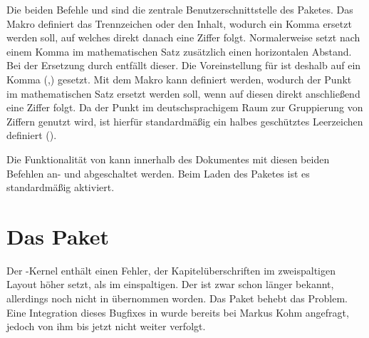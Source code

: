 \begin{Declaration*}{}
\begin{Declaration}{}
\begin{Declaration}{}
\printdeclarationlist%
%
Die beiden Befehle  und  sind die zentrale 
Benutzerschnittstelle des Paketes. Das Makro  definiert das 
Trennzeichen oder den Inhalt, wodurch ein Komma ersetzt werden soll, auf 
welches direkt danach eine Ziffer folgt. Normalerweise setzt 
nach einem Komma im mathematischen Satz zusätzlich einen horizontalen Abstand.
Bei der Ersetzung durch  entfällt dieser. Die Voreinstellung
für  ist deshalb auf ein Komma (,) gesetzt. Mit dem Makro 
 kann definiert werden, wodurch der Punkt im mathematischen 
Satz ersetzt werden soll, wenn auf diesen direkt anschließend eine Ziffer 
folgt. Da der Punkt im deutschsprachigem Raum zur Gruppierung von Ziffern 
genutzt wird, ist hierfür standardmäßig ein halbes geschütztes Leerzeichen 
definiert (\Macro*{,}).
\end{Declaration}
\end{Declaration}
\begin{Declaration}[v2.02]{}
\begin{Declaration}[v2.02]{}
\printdeclarationlist%
%
%
Die Funktionalität von  kann innerhalb des Dokumentes mit 
diesen beiden Befehlen an- und abgeschaltet werden. Beim Laden des Paketes ist 
es standardmäßig aktiviert.
\end{Declaration}
\end{Declaration}
\end{Declaration*}



\section{Das Paket }
\begin{Declaration*}{}
%
%
Der -Kernel enthält einen Fehler, der Kapitelüberschriften im
zweispaltigen Layout höher setzt, als im einspaltigen. Der 
ist zwar schon länger bekannt, allerdings noch nicht in  
übernommen worden. Das Paket  behebt das Problem. Eine 
Integration dieses Bugfixes in \KOMAScript{} wurde bereits bei Markus Kohm 
angefragt, jedoch von ihm bis jetzt  
{nicht weiter verfolgt}.
\end{Declaration*}




